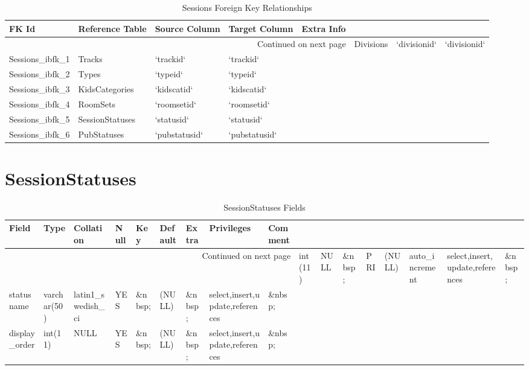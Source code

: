 \documentclass[tablesignature]{scrartcl}
\begin{document}
\begin{longtable}{|l|l|l|l|l|}
\caption{Sessions Foreign Key Relationships} \label{tbl:sessionsfkr}\\
\hline
 FK Id                  &  Reference Table  &  Source Column  &  Target Column  &  Extra Info \\
\hline
\endhead
\hline\multicolumn{5}{r}{Continued on next page}\
\endfoot
\endlastfoot
\hline
 Sessions\_{}ibfk\_{}7  &  Divisions        &  `divisionid`   &  `divisionid`   &              \\
 Sessions\_{}ibfk\_{}1  &  Tracks           &  `trackid`      &  `trackid`      &              \\
 Sessions\_{}ibfk\_{}2  &  Types            &  `typeid`       &  `typeid`       &              \\
 Sessions\_{}ibfk\_{}3  &  KidsCategories   &  `kidscatid`    &  `kidscatid`    &              \\
 Sessions\_{}ibfk\_{}4  &  RoomSets         &  `roomsetid`    &  `roomsetid`    &              \\
 Sessions\_{}ibfk\_{}5  &  SessionStatuses  &  `statusid`     &  `statusid`     &              \\
 Sessions\_{}ibfk\_{}6  &  PubStatuses      &  `pubstatusid`  &  `pubstatusid`  &              \\
\hline
\end{longtable}
\section{SessionStatuses}
\label{sec-30}


\begin{longtable}{|l|l|l|l|l|l|l|l|l|}
\caption{SessionStatuses Fields} \label{tbl:sessionstatusesfields}\\
\hline
 Field             &  Type         &  Collation                &  Null     &  Key      &  Default  &  Extra              &  Privileges                       &  Comment \\
\hline
\endhead
\hline\multicolumn{9}{r}{Continued on next page}\
\endfoot
\endlastfoot
\hline
 statusid          &  int(11)      &  NULL                     &  \&nbsp;  &  PRI      &  (NULL)   &  auto\_{}increment  &  select,insert,update,references  &  \&nbsp;  \\
 statusname        &  varchar(50)  &  latin1\_{}swedish\_{}ci  &  YES      &  \&nbsp;  &  (NULL)   &  \&nbsp;            &  select,insert,update,references  &  \&nbsp;  \\
 display\_{}order  &  int(11)      &  NULL                     &  YES      &  \&nbsp;  &  (NULL)   &  \&nbsp;            &  select,insert,update,references  &  \&nbsp;  \\
\hline
\end{longtable}
\end{document}

